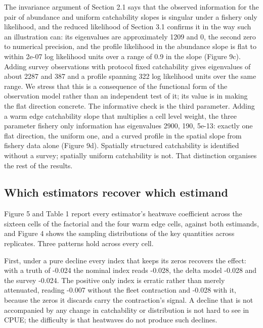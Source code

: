 \documentclass[
  11pt,
  a4paper,
]{article}
\begin{document}
The invariance argument of Section 2.1 says that the observed
information for the pair of abundance and uniform catchability slopes is
singular under a fishery only likelihood, and the reduced likelihood of
Section 3.1 confirms it in the way such an illustration can: its
eigenvalues are approximately 1209 and 0, the second zero to numerical
precision, and the profile likelihood in the abundance slope is flat to
within 2e-07 log likelihood units over a range of 0.9 in the slope
(Figure 9c). Adding survey observations with protocol fixed catchability
gives eigenvalues of about 2287 and 387 and a profile spanning 322 log
likelihood units over the same range. We stress that this is a
consequence of the functional form of the observation model rather than
an independent test of it; its value is in making the flat direction
concrete. The informative check is the third parameter. Adding a warm
edge catchability slope that multiplies a cell level weight, the three
parameter fishery only information has eigenvalues 2900, 190, 5e-13:
exactly one flat direction, the uniform one, and a curved profile in the
spatial slope from fishery data alone (Figure 9d). Spatially structured
catchability is identified without a survey; spatially uniform
catchability is not. That distinction organises the rest of the results.

\hypertarget{which-estimators-recover-which-estimand}{%
\subsection{Which estimators recover which
estimand}\label{which-estimators-recover-which-estimand}}

Figure 5 and Table 1 report every estimator's heatwave coefficient
across the sixteen cells of the factorial and the four warm edge cells,
against both estimands, and Figure 4 shows the sampling distributions of
the key quantities across replicates. Three patterns hold across every
cell.

First, under a pure decline every index that keeps its zeros recovers
the effect: with a truth of -0.024 the nominal index reads -0.028, the
delta model -0.028 and the survey -0.024. The positive only index is
erratic rather than merely attenuated, reading -0.007 without the fleet
contraction and -0.028 with it, because the zeros it discards carry the
contraction's signal. A decline that is not accompanied by any change in
catchability or distribution is not hard to see in CPUE; the difficulty
is that heatwaves do not produce such declines.
\end{document}
